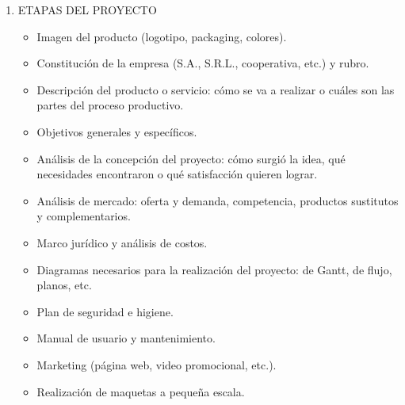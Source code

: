 \documentclass[../main]{subfiles}
\begin{document}
\begin{enumerate}
  \item ETAPAS DEL PROYECTO
    \begin{itemize}
      \item Imagen del producto (logotipo, packaging,
        colores).
      \item Constitución de la empresa (S.A., S.R.L.,
        cooperativa, etc.) y rubro.
      \item Descripción del producto o servicio: cómo se va
        a realizar o cuáles son las partes del proceso productivo.
      \item Objetivos generales y específicos.
      \item Análisis de la concepción del proyecto: cómo
        surgió la idea, qué necesidades encontraron o
        qué satisfacción quieren lograr.
      \item Análisis de mercado: oferta y demanda,
        competencia, productos sustitutos y
        complementarios.
      \item Marco jurídico y análisis de costos.
      \item Diagramas necesarios para la realización del
        proyecto: de Gantt, de flujo, planos, etc.
      \item Plan de seguridad e higiene.
      \item Manual de usuario y mantenimiento.
      \item Marketing (página web, video promocional, etc.).
      \item Realización de maquetas a pequeña escala.
    \end{itemize}
\end{enumerate}
\tableofcontents
\newpage
\end{document}
